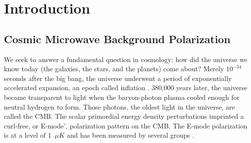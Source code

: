 \chapter{Introduction}
\label{intro_chapter}




\section{Cosmic Microwave Background Polarization}
\label{sec:cmb_science}


We seek to answer a fundamental question in cosmology:  how did the universe we know today (the galaxies, the stars, and the planets) come about?  
Merely $10^{-34}$ seconds after the big bang, the universe underwent a period of exponentially accelerated expansion, an epoch called inflation \cite{Guth1981} \cite{Linde1982} \cite{peebles} \cite{Spergel2007} \cite{Tegmark2006} \cite{PlanckXIII} \cite{PlanckXX}.  
380,000 years later, the universe became transparent to light when the baryon-photon plasma cooled enough for neutral hydrogen to form. 
Those photons, the oldest light in the universe, are called the \ac{CMB}.
The scalar primordial energy density perturbations imprinted a curl-free, or E-mode', polarization pattern on the \ac{CMB}. 
The E-mode polarization is at a level of 1~$\mu K$ and has been measured by several groups \cite{leitch2005} \cite{montroy2006} \cite{wu2007} \cite{sievers2007} \cite{nolta2009}. 

